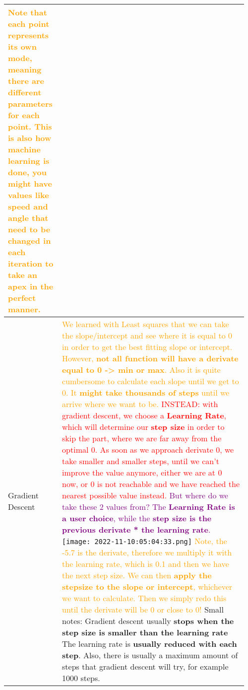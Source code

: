 \documentclass[main.tex,fontsize=8pt,paper=a4,paper=portrait,DIV=calc,]{scrartcl}
\begin{document}
\begin{table}[ht!]
\begin{tabular}{|m{0.2\linewidth}|m{0.755\linewidth}|}
\textcolor{orange}{Note that each point represents its own mode, meaning there are different parameters for each point.\newline
This is also how machine learning is done, you might have values like speed and angle that need to be changed in each iteration to take an apex in the perfect manner.}\\
\hline
Gradient Descent & 
\textcolor{orange}{We learned with Least squares that we can take the slope/intercept and see where it is equal to 0 in order to get the best fitting slope or intercept. \newline
However, \textbf{not all function will have a derivate equal to 0 -> min or max}. Also it is quite cumbersome to calculate each slope until we get to 0. It \textbf{might take thousands of steps} until we arrive where we want to be.}\newline
\textcolor{red}{INSTEAD: with gradient descent, we choose a \textbf{Learning Rate}, which will determine our \textbf{step size} in order to skip the part, where we are far away from the optimal 0.\newline
As soon as we approach derivate 0, we take smaller and smaller steps, until we can't improve the value anymore, either we are at 0 now, or 0 is not reachable and we have reached the nearest possible value instead.}\newline
\textcolor{purple}{But where do we take these 2 values from? The \textbf{Learning Rate is a user choice}, while the \textbf{step size is the previous derivate * the learning rate}.}\newline
\texttt{[image: 2022-11-10:05:04:33.png]}\newline
\textcolor{orange}{Note, the -5.7 is the derivate, therefore we multiply it with the learning rate, which is 0.1 and then we have the next step size.\newline
We can then \textbf{apply the stepsize to the slope or intercept}, whichever we want to calculate.\newline
Then we simply redo this until the derivate will be 0 or close to 0!}\newline
Small notes: Gradient descent usually \textbf{stops when the step size is smaller than the learning rate}\newline
The learning rate is \textbf{usually reduced with each step}.\newline
Also, there is usually a maximum amount of steps that gradient descent will try, for example 1000 steps.\newline

\end{tabular}
\end{table}
\end{document}
